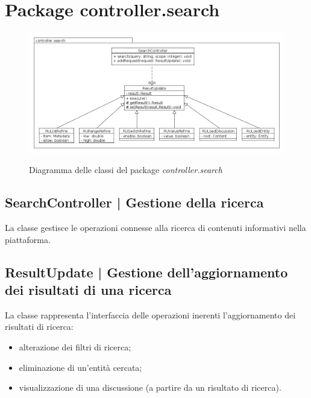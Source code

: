 \documentclass[10pt,a4paper,headinclude,footinclude,hidelinks]{scrreprt} %
\begin{document}
	\section{Package controller.search}
	\label{sec:stage:design:controller.search}

	\begin{figure}[ht]
		\begin{center}
	    	\includegraphics[width=12cm]{class/controller_search.png}
			\label{gfx:class:controller:search}
			\caption{Diagramma delle classi del package \textit{controller.search}}
		\end{center}
	\end{figure}	

	\subsection[SearchController]{SearchController | Gestione della ricerca}
	\label{sec:stage:design:controller:search}
	La classe \textit{} gestisce le operazioni connesse alla ricerca di contenuti informativi nella piattaforma.

	\subsection[ResultUpdate]{ResultUpdate | Gestione dell'aggiornamento dei risultati di una ricerca}
	\label{sec:stage:design:controller.search:result-update}
	La classe \textit{} rappresenta l'interfaccia delle operazioni inerenti l'aggiornamento dei risultati di ricerca:
	\begin{itemize}
	\item alterazione dei filtri di ricerca;
	\item eliminazione di un'entità cercata;
	\item visualizzazione di una discussione (a partire da un risultato di ricerca).
	\end{itemize}
\end{document}
